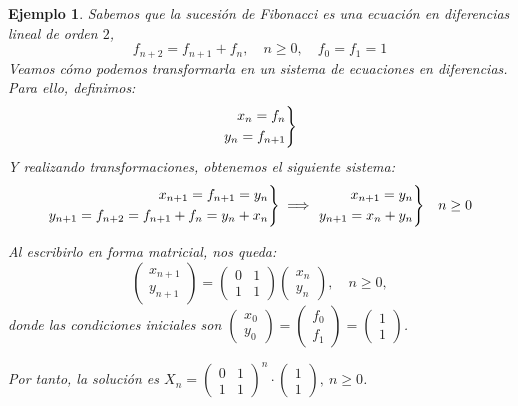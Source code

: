 \documentclass[11pt, a4paper]{article}
\newif\IfInSansMode
\numberwithin{equation}{section}
\theoremstyle{theorem-style}
\theoremstyle{definition-style}
\theoremstyle{remark-style}
\theoremstyle{example-style}
\newtheorem{ejemplo}{Ejemplo}[section]
\newenvironment{rcases}
  {\left.\begin{aligned}}
  {\end{aligned}\right\rbrace}
\begin{document}
\begin{ejemplo}
  Sabemos que la \textit{sucesión de Fibonacci} es una ecuación en diferencias lineal de orden $2$, $$f_{n+2} = f_{n+1} + f_n,\quad n \ge 0,\quad f_0=f_1=1$$
   Veamos cómo podemos transformarla en un sistema de ecuaciones en diferencias. Para ello, definimos:
  $$
  \begin{rcases}
    x_n = f_n \\
    y_n = f_{n+1}
  \end{rcases}$$
  Y realizando transformaciones, obtenemos el siguiente sistema:
  $$
  \begin{rcases}
    x_{n+1} = f_{n+1} = y_n \\
    y_{n+1} = f_{n+2} = f_{n+1} + f_n = y_n + x_n
  \end{rcases} \implies 
  \begin{rcases}
    x_{n+1} = y_n \\
    y_{n+1} = x_n + y_n
  \end{rcases}\quad n \ge 0$$

Al escribirlo en forma matricial, nos queda:
  $$
  \begin{pmatrix}
    x_{n+1} \\
    y_{n+1}
  \end{pmatrix} = 
  \begin{pmatrix}
    0 & 1 \\
    1 & 1
  \end{pmatrix}
  \begin{pmatrix}
    x_n \\
    y_n
  \end{pmatrix},\quad n \ge 0,$$ donde las condiciones iniciales son
  $\begin{pmatrix}
    x_0 \\
    y_0
  \end{pmatrix} =
  \begin{pmatrix}
    f_0 \\
f_1 
  \end{pmatrix} =
  \begin{pmatrix}
    1 \\
    1
  \end{pmatrix}$.
  
  Por tanto, la solución es $X_n = \begin{pmatrix}
    0 & 1 \\
    1 & 1
  \end{pmatrix}^n \cdot \begin{pmatrix}
	1 \\
	1
\end{pmatrix}, \ n \ge 0$.

\end{ejemplo}
\end{document}

